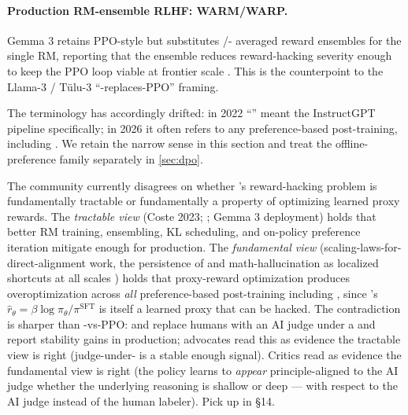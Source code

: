 \paragraph{Production RM-ensemble RLHF: WARM/WARP.} Gemma 3
\citep{gemma3} retains PPO-style  but substitutes /-
averaged reward ensembles for the single RM, reporting that the
ensemble reduces reward-hacking severity enough to keep the PPO loop
viable at frontier scale \citep{warm-2024, warp-2024}. This is the
counterpoint to the Llama-3 / T\"ulu-3 ``-replaces-PPO'' framing.

The terminology has accordingly drifted: in 2022 ``'' meant the
InstructGPT pipeline specifically; in 2026 it often refers to any
preference-based post-training, including . We retain the narrow
sense in this section and treat the offline-preference family
separately in \cref{sec:dpo}.

\begin{contradiction}
The community currently disagrees on whether 's reward-hacking
problem is fundamentally tractable or fundamentally a property of
optimizing learned proxy rewards. The \emph{tractable view} (Coste
2023; \citealt{warm-2024, warp-2024}; Gemma 3 deployment) holds that
better RM training, ensembling, KL scheduling, and on-policy
preference iteration mitigate  enough for production.
The \emph{fundamental view} (scaling-laws-for-direct-alignment work,
the persistence of  and math-hallucination as localized
shortcuts at all scales \citep{sharma2023-sycophancy}) holds that
proxy-reward optimization produces overoptimization across
\emph{all} preference-based post-training including , since 's
 $\hat r_\theta = \beta \log
\pi_\theta / \pi^{\mathrm{SFT}}$ is itself a learned proxy that can be
hacked. The contradiction is sharper than -vs-PPO:  and 
\citep{bai2022-cai} replace humans with an AI judge under a
 and report stability gains in production; advocates
read this as evidence the tractable view is right (judge-under-
 is a stable enough signal). Critics read  as
evidence the fundamental view is right (the policy learns to
\emph{appear} principle-aligned to the AI judge whether the
underlying reasoning is shallow or deep —  with respect to
the AI judge instead of the human labeler). Pick up in \S 14.
\end{contradiction}

